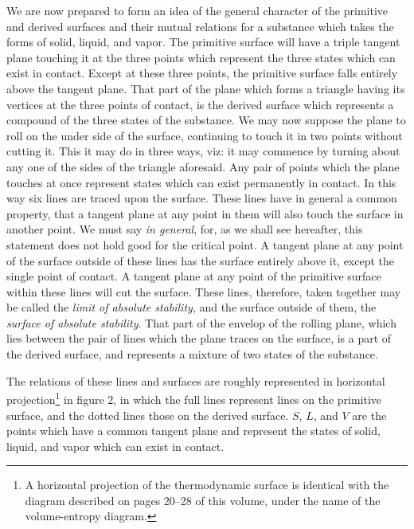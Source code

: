\documentclass[11pt]{article}
\begin{document}
We are now prepared to form an idea of the general character of the primitive and derived surfaces and their mutual relations for a substance which takes the forms of solid, liquid, and vapor. The primitive surface will have a triple tangent plane touching it at the three points which represent the three states which can exist in contact. Except at these three points, the primitive surface falls entirely above the tangent plane. That part of the plane which forms a triangle having its vertices at the three points of contact, is the derived surface which represents a compound of the three states of the substance. We may now suppose the plane to roll on the under side of the surface, continuing to touch it in two points without cutting it. This it may do in three ways, viz: it may commence by turning about any one of the sides of the triangle aforesaid. Any pair of points which the plane touches at once represent states which can exist permanently in contact. In this way six lines are traced upon the surface. These lines have in general a common property, that a tangent plane at any point in them will also touch the surface in another point. We must say \emph{in general}, for, as we shall see hereafter, this statement does not hold good for the critical point. A tangent plane at any point of the surface outside of these lines has the surface entirely above it, except the single point of contact. A tangent plane at any point of the primitive surface within these lines will cut the surface. These lines, therefore, taken together may be called the \emph{limit of absolute stability}, and the surface outside of them, the \emph{surface of absolute stability}. That part of the envelop of the rolling plane, which lies between the pair of lines which the plane traces on the surface, is a part of the derived surface, and represents a mixture of two states of the substance.

The relations of these lines and surfaces are roughly represented in horizontal projection\footnote{A horizontal projection of the thermodynamic surface is identical with the diagram described on pages 20--28 of this volume, under the name of the volume-entropy diagram.} in figure 2, in which the full lines represent lines on the primitive surface, and the dotted lines those on the derived surface. $S$, $L$, and $V$ are the points which have a common tangent plane and represent the states of solid, liquid, and vapor which can exist in contact.
\end{document}
